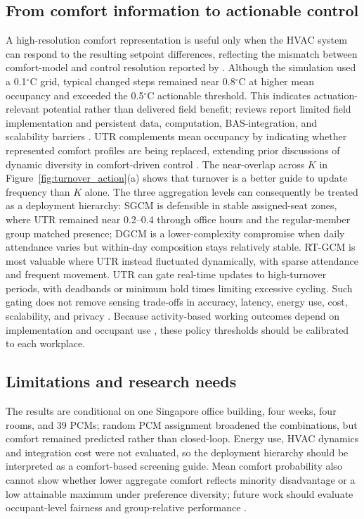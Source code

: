 \subsection{From comfort information to actionable control}
A high-resolution comfort representation is useful only when the HVAC system can respond to the resulting setpoint differences, reflecting the mismatch between comfort-model and control resolution reported by \textcite{ono_effects_2022}.
Although the simulation used a 0.1$^\circ$C grid, typical changed steps remained near 0.8$^\circ$C at higher mean occupancy and exceeded the 0.5$^\circ$C actionable threshold.
This indicates actuation-relevant potential rather than delivered field benefit; reviews report limited field implementation and persistent data, computation, BAS-integration, and scalability barriers \parencite{xie_review_2020,soleimanijavid_challenges_2024}.
UTR complements mean occupancy by indicating whether represented comfort profiles are being replaced, extending prior discussions of dynamic diversity in comfort-driven control \parencite{jung_energy_2020}.
The near-overlap across $K$ in Figure~\ref{fig:turnover_action}(a) shows that turnover is a better guide to update frequency than $K$ alone.
The three aggregation levels can consequently be treated as a deployment hierarchy: SGCM is defensible in stable assigned-seat zones, where UTR remained near 0.2--0.4 through office hours and the regular-member group matched presence; DGCM is a lower-complexity compromise when daily attendance varies but within-day composition stays relatively stable.
RT-GCM is most valuable where UTR instead fluctuated dynamically, with sparse attendance and frequent movement.
UTR can gate real-time updates to high-turnover periods, with deadbands or minimum hold times limiting excessive cycling.
Such gating does not remove sensing trade-offs in accuracy, latency, energy use, cost, scalability, and privacy \parencite{zafari_survey_2019}.
Because activity-based working outcomes depend on implementation and occupant use \parencite{marzban_review_2023}, these policy thresholds should be calibrated to each workplace.

\subsection{Limitations and research needs}
The results are conditional on one Singapore office building, four weeks, four rooms, and 39 PCMs; random PCM assignment broadened the combinations, but comfort remained predicted rather than closed-loop.
Energy use, HVAC dynamics and integration cost were not evaluated, so the deployment hierarchy should be interpreted as a comfort-based screening guide.
Mean comfort probability also cannot show whether lower aggregate comfort reflects minority disadvantage or a low attainable maximum under preference diversity; future work should evaluate occupant-level fairness and group-relative performance \parencite{wang_enhancing_2026}.
